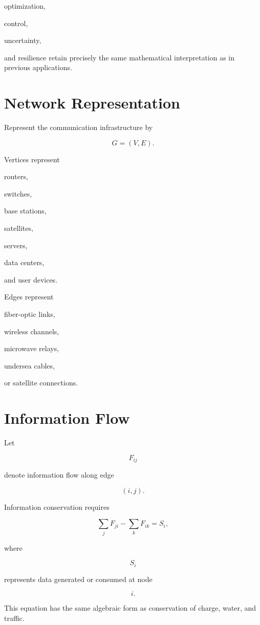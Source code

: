 \documentclass[11pt,fleqn]{book}
\numberwithin{equation}{chapter}
\theoremstyle{plain}
\theoremstyle{definition}
\theoremstyle{remark}
\begin{document}
optimization,

control,

uncertainty,

and resilience retain precisely the same mathematical interpretation as
in previous applications.


\section{Network Representation}

Represent the communication infrastructure by

\[
G=(V,E).
\]

Vertices represent

routers,

switches,

base stations,

satellites,

servers,

data centers,

and user devices.

Edges represent

fiber-optic links,

wireless channels,

microwave relays,

undersea cables,

or satellite connections.


\section{Information Flow}

Let

\[
F_{ij}
\]

denote information flow along edge

\[
(i,j).
\]

Information conservation requires

\[
\boxed{
\sum_jF_{ji}
-
\sum_kF_{ik}
=
S_i,
}
\]

where

\[
S_i
\]

represents data generated or consumed at node

\[
i.
\]

This equation has the same algebraic form as conservation of charge,
water, and traffic.
\end{document}
